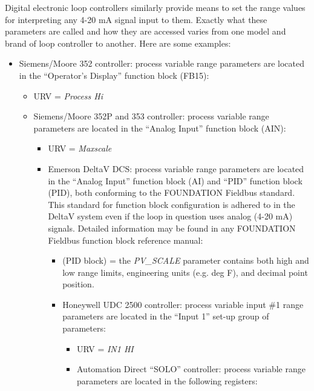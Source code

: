 \vskip 10pt

\filbreak

Digital electronic loop controllers similarly provide means to set the range values for interpreting any 4-20 mA signal input to them.  Exactly what these parameters are called and how they are accessed varies from one model and brand of loop controller to another.  Here are some examples:

\begin{itemize}
\item{} Siemens/Moore 352 controller: process variable range parameters are located in the ``Operator's Display'' function block (FB15):
\begin{itemize}

\item{} URV = {\it Process Hi}
\vskip 10pt
\item{} Siemens/Moore 352P and 353 controller: process variable range parameters are located in the ``Analog Input'' function block (AIN):
\begin{itemize}

\item{} URV = {\it Maxscale}
\vskip 10pt
\item{} Emerson DeltaV DCS: process variable range parameters are located in the ``Analog Input'' function block (AI) and ``PID'' function block (PID), both conforming to the FOUNDATION Fieldbus standard.  This standard for function block configuration is adhered to in the DeltaV system even if the loop in question uses analog (4-20 mA) signals.  Detailed information may be found in any FOUNDATION Fieldbus function block reference manual:
\begin{itemize}

\item{} (PID block) = the {\it PV\_SCALE} parameter contains both high and low range limits, engineering units (e.g. deg F), and decimal point position.
\vskip 10pt
\item{} Honeywell UDC 2500 controller: process variable input \#1 range parameters are located in the ``Input 1'' set-up group of parameters:
\begin{itemize}

\item{} URV = {\it IN1 HI}
\vskip 10pt
\item{} Automation Direct ``SOLO'' controller: process variable range parameters are located in the following registers:
\begin{itemize}


\end{itemize}
\end{itemize}
\end{itemize}
\end{itemize}
\end{itemize}
\end{itemize}
